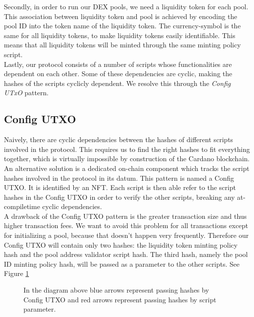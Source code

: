 \documentclass{article}
\begin{document}
Secondly, in order to run our DEX pools, we need a liquidity token for each
pool. This association between liquidity token and pool is achieved by encoding
the pool ID into the token name of the liquidity token. The currency-symbol is
the same for all liquidity tokens, to make liquidity tokens easily identifiable.
This means that all liquidity tokens will be minted through the same minting
policy script. \\

Lastly, our protocol consists of a number of scripts whose functionalities are
dependent on each other. Some of these dependencies are cyclic, making the
hashes of the scripts cyclicly dependent. We resolve this through the
\textit{Config UTxO} pattern.

\subsection{Config UTXO}

Naively, there are cyclic dependencies between the hashes of different scripts
involved in the protocol. This requires us to find the right hashes to fit
everything together, which is virtually impossible by construction of the
Cardano blockchain. An alternative solution is a dedicated on-chain component
which tracks the script hashes involved in the protocol in its datum. This
pattern is named a Config UTXO. It is identified by an NFT. Each script is then
able refer to the script hashes in the Config UTXO in order to verify the other
scripts, breaking any at-compiletime cyclic dependencies. \\

A drawback of the Config UTXO pattern is the greater transaction size and thus
higher transaction fees. We want to avoid this problem for all transactions
except for initializing a pool, because that doesn't happen very frequently.
Therefore our Config UTXO will contain only two hashes: the liquidity token
minting policy hash and the pool address validator script hash. The third hash,
namely the pool ID minting policy hash, will be passed as a parameter to the
other scripts. See Figure \ref{hashGraph} \\

\begin{figure}
  \caption{
    In the diagram above blue arrows represent passing hashes by Config UTXO and
    red arrows represent passing hashes by script parameter.
  }
  \label{hashGraph}
\end{figure}
\end{document}
